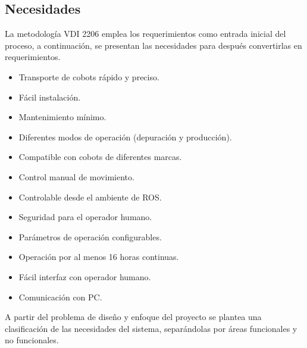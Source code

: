 \subsection{Necesidades}
La metodología VDI 2206 emplea los requerimientos como entrada inicial del proceso, a continuación, se presentan las necesidades para después convertirlas en requerimientos.
\begin{itemize}
    \item Transporte de cobots rápido y preciso.
    \item Fácil instalación.
    \item Mantenimiento mínimo.
    \item Diferentes modos de operación (depuración y producción).
    \item Compatible con cobots de diferentes marcas.
    \item Control manual de movimiento.
    \item Controlable desde el ambiente de ROS.
    \item Seguridad para el operador humano.
    \item Parámetros de operación configurables.
    \item Operación por al menos 16 horas continuas.
    \item Fácil interfaz con operador humano.
    \item Comunicación con PC.
\end{itemize}
A partir del problema de diseño y enfoque del proyecto se plantea una clasificación de las necesidades del sistema, separándolas por áreas funcionales y no funcionales.


